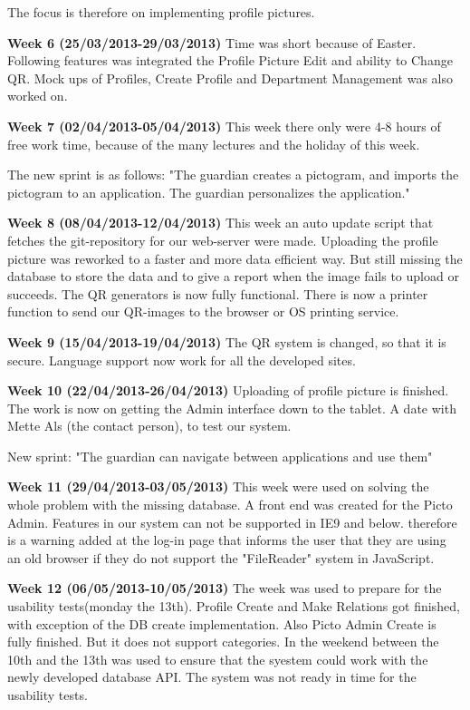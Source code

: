 The focus is therefore on implementing profile pictures. 

\textbf{Week 6 (25/03/2013-29/03/2013)}
Time was short because of Easter. 
Following features was integrated the Profile Picture Edit and ability to Change QR.
Mock ups of Profiles, Create Profile and Department Management was also worked on.    

\textbf{Week 7 (02/04/2013-05/04/2013)}
This week there only were 4-8 hours of free work time, because of the many lectures and the holiday of this week.

The new sprint is as follows: 
"The guardian creates a pictogram, and imports the pictogram to an application. The guardian personalizes the application."

\textbf{Week 8 (08/04/2013-12/04/2013)}
This week an auto update script that fetches the git-repository for our web-server were made.
Uploading the profile picture was reworked to a faster and more data efficient way. 
But still missing the database to store the data and to give a report when the image fails to upload or succeeds.
The QR generators is now fully functional. 
There is now a printer function to send our QR-images to the browser or OS printing service.

\textbf{Week 9 (15/04/2013-19/04/2013)}
The QR system is changed, so that it is secure. 
Language support now work for all the developed sites.

\textbf{Week 10 (22/04/2013-26/04/2013)}
Uploading of profile picture is finished.
The work is now on getting the Admin interface down to the tablet.
A date with Mette Als (the contact person), to test our system.

New sprint: 
"The guardian can navigate between applications and use them"

\textbf{Week 11 (29/04/2013-03/05/2013)}
This week were used on solving the whole problem with the missing database.
A front end was created for the Picto Admin. Features  in our system can not be supported in IE9 and below. therefore is a warning added at the log-in page that informs the user that they are using an old browser if they do not support the "FileReader" system in JavaScript.

\textbf{Week 12 (06/05/2013-10/05/2013)}
The week was used to prepare for the usability tests(monday the 13th).
Profile Create and Make Relations got finished, with exception of the DB create implementation. 
Also Picto Admin Create is fully finished. But it does not support categories. 
In the weekend between the 10th and the 13th was used to ensure that the syestem could work with the newly developed database API. The system was not ready in time for the usability tests. 


